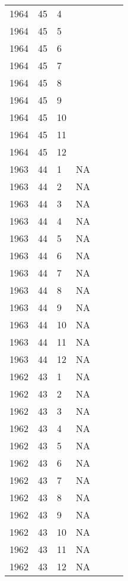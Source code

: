 \begin{longtable}{ |l|l|l|l|p{2.7cm}|l|p{2cm}| }
 1964 & 45 &     4 &         &                &  & \\
 1964 & 45 &     5 &         &                &  & \\
 1964 & 45 &     6 &         &                &  & \\
 1964 & 45 &     7 &         &                &  & \\
 1964 & 45 &     8 &         &                &  & \\
 1964 & 45 &     9 &         &                &  & \\
 1964 & 45 &    10 &         &                &   & \\
 1964 & 45 &    11 &         &                &  & \\
 1964 & 45 &    12 &         &                &  & \\
 1963 & 44 &     1 &      NA &                &  & \\
 1963 & 44 &     2 &      NA &                &  & \\
 1963 & 44 &     3 &      NA &                &  & \\
 1963 & 44 &     4 &      NA &                &  & \\
 1963 & 44 &     5 &      NA &                &  & \\
 1963 & 44 &     6 &      NA &                &  & \\
 1963 & 44 &     7 &      NA &                &  & \\
 1963 & 44 &     8 &      NA &                &  & \\
 1963 & 44 &     9 &      NA &                &  & \\
 1963 & 44 &    10 &      NA &                &  & \\
 1963 & 44 &    11 &      NA &                &  & \\
 1963 & 44 &    12 &      NA &                &  & \\
 1962 & 43 &     1 &      NA &                &  & \\
 1962 & 43 &     2 &      NA &                &  & \\
 1962 & 43 &     3 &      NA &                &  & \\
 1962 & 43 &     4 &      NA &                &  & \\
 1962 & 43 &     5 &      NA &                &  & \\
 1962 & 43 &     6 &      NA &                &  & \\
 1962 & 43 &     7 &      NA &                &   & \\
 1962 & 43 &     8 &      NA &                &  & \\
 1962 & 43 &     9 &      NA &                &  & \\
 1962 & 43 &    10 &      NA &                &  & \\
 1962 & 43 &    11 &      NA &                &  & \\
 1962 & 43 &    12 &      NA &                &  & \\
\end{longtable}
